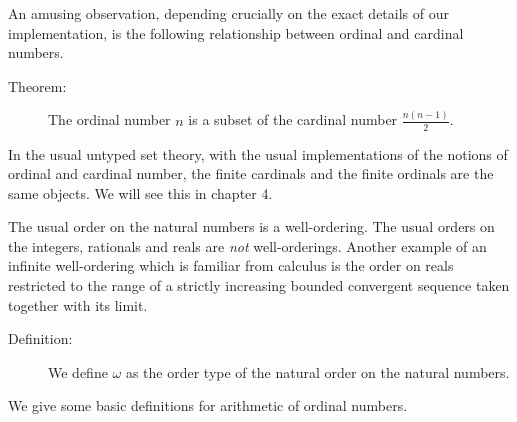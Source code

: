 \documentclass[12pt]{book}
\begin{document}
An amusing observation, depending crucially on the exact details of
our implementation, is the following relationship between ordinal and
cardinal numbers.
\begin{description}
\item[Theorem:] The ordinal number $n$ is a subset of the cardinal
number $\frac{n(n-1)}2$.
\end{description}

In the usual untyped set theory, with the usual implementations of the
notions of ordinal and cardinal number, the finite cardinals and the
finite ordinals are the same objects.  We will see this in chapter 4.

The usual order on the natural numbers is a well-ordering.  The usual
orders on the integers, rationals and reals are {\em not\/}
well-orderings.  Another example of an infinite well-ordering which is
familiar from calculus is the order on reals restricted to the range
of a strictly increasing bounded convergent  sequence taken together with its
limit.


\begin{description}
\item[Definition:] We define $\omega$ as the order type of the natural
order on the natural numbers.
\end{description}

We give some basic definitions for arithmetic of ordinal numbers.
\end{document}
